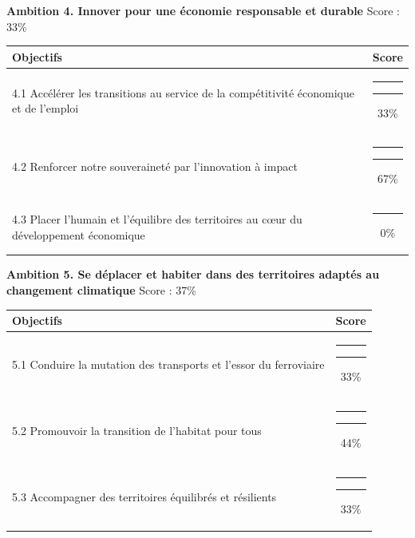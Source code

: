\documentclass[
]{article}
\begin{document}
\needspace{8cm}
\vspace{0.8cm}

\textbf{\fontsize{10pt}{12pt}\selectfont Ambition 4. Innover pour une économie responsable et durable}
\hfill \small Score : 33\%

\begin{center}
\begin{tabular}{p{10cm}c}
\toprule
Objectifs & Score \\
\midrule
4.1 Accélérer les transitions au service de la compétitivité économique et de l’emploi & {\color[HTML]{EB6E26}\rule{1.98cm}{3pt}}{\color{gray}\rule{4.02cm}{3pt}}\hspace{0.3cm}33\% \\
4.2 Renforcer notre souveraineté par l’innovation à impact & {\color[HTML]{6E9E62}\rule{4.02cm}{3pt}}{\color{gray}\rule{1.98cm}{3pt}}\hspace{0.3cm}67\% \\
4.3 Placer l’humain et l’équilibre des territoires au cœur du développement économique & {\color[HTML]{CC1414}\rule{0cm}{3pt}}{\color{gray}\rule{6cm}{3pt}}\hspace{0.3cm}0\% \\
\bottomrule
\end{tabular}
\end{center}

\needspace{8cm}
\vspace{0.8cm}

\textbf{\fontsize{10pt}{12pt}\selectfont Ambition 5. Se déplacer et habiter dans des territoires adaptés au changement climatique}
\hfill \small Score : 37\%

\begin{center}
\begin{tabular}{p{10cm}c}
\toprule
Objectifs & Score \\
\midrule
5.1 Conduire la mutation des transports et l’essor du ferroviaire & {\color[HTML]{EB6E26}\rule{1.98cm}{3pt}}{\color{gray}\rule{4.02cm}{3pt}}\hspace{0.3cm}33\% \\
5.2 Promouvoir la transition de l’habitat pour tous & {\color[HTML]{EB6E26}\rule{2.64cm}{3pt}}{\color{gray}\rule{3.36cm}{3pt}}\hspace{0.3cm}44\% \\
5.3 Accompagner des territoires équilibrés et résilients & {\color[HTML]{EB6E26}\rule{1.98cm}{3pt}}{\color{gray}\rule{4.02cm}{3pt}}\hspace{0.3cm}33\% \\
\bottomrule
\end{tabular}
\end{center}
\end{document}
